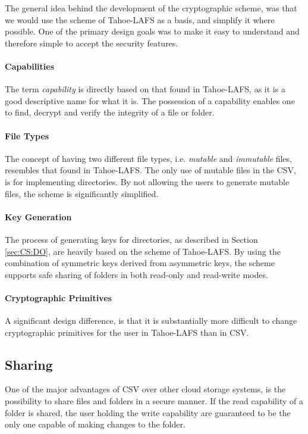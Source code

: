 \documentclass[pdftex,english,10pt,b5paper,twoside]{book}
\begin{document}
The general idea behind the development of the cryptographic scheme, was that
we would use the scheme of Tahoe-\ac{LAFS} as a basis, and simplify it where
possible. One of the primary design goals was to make it easy to
understand and therefore simple to accept the security features.

\paragraph{Capabilities} The term \emph{capability} is directly based on that
found in Tahoe-\ac{LAFS}, as it is a good descriptive name for what it is. The
possession of a capability enables one to find, decrypt and verify the
integrity of a file or folder.

\paragraph{File Types} The concept of having two different file types, i.e.
\emph{mutable} and \emph{immutable} files, resembles that found in
Tahoe-\ac{LAFS}. The only use of mutable files in the \acl{CSV}, is for
implementing directories. By not allowing the users to generate mutable files,
the scheme is significantly simplified.

\paragraph{Key Generation} The process of generating keys for directories, as
described in Section \ref{sec:CS:DO}, are heavily based on the scheme of
Tahoe-\ac{LAFS}. By using the combination of symmetric keys derived from
asymmetric keys, the scheme supports safe sharing of folders in both read-only
and read-write modes.

\paragraph{Cryptographic Primitives} A significant design difference, is that
it is substantially more difficult to change cryptographic primitives for the
user in Tahoe-\ac{LAFS} than in \ac{CSV}.

\subsection{Sharing}

One of the major advantages of \ac{CSV} over other cloud storage systems, is
the possibility to share files and folders in a secure manner. If the read
capability of a folder is shared, the user holding the write capability are
guaranteed to be the only one capable of making changes to the folder.
\end{document}
